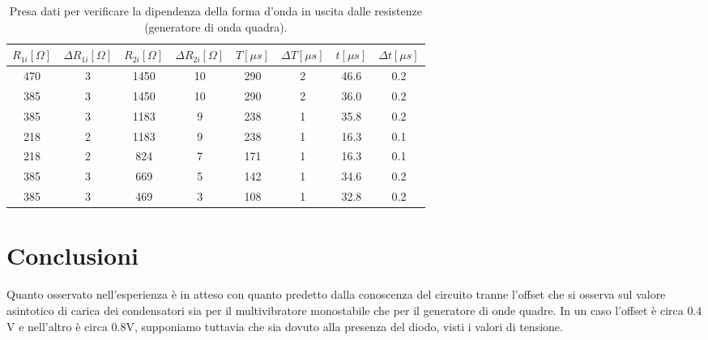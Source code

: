 \documentclass[10pt,a4paper]{article}
\begin{document}

\begin{table}[!htb]
\centering
\begin{tabular}{|c|c|c|c|c|c|c|c|}
\hline 
$R_{1i} [\Omega]$ & $\Delta R_{1i} [\Omega]$ & $R_{2i} [\Omega]$  & $\Delta R_{2i} [\Omega]$ & $T [\mu s]$ & $\Delta T [\mu s]$&$t [\mu s ]$ & $\Delta t [\mu s]$\\
\hline
 470 & 3 & 1450	& 10 & 290 & 2& 46.6& 0.2\\ 
\hline
385 & 3 & 1450	& 10 & 290 & 2& 36.0& 0.2\\ 
\hline 
 385 & 3 & 1183	& 9 & 238 & 1& 35.8& 0.2\\
\hline
218 & 2 & 1183	& 9 & 238 & 1& 16.3& 0.1\\ 
\hline
218 & 2 & 824	& 7 & 171 & 1& 16.3& 0.1\\ 
\hline
385 & 3 & 669	& 5 & 142 & 1& 34.6& 0.2\\ 
\hline
 385 & 3 & 469	& 3 & 108 & 1& 32.8& 0.2\\ 
 \hline
\end{tabular} 
\caption{Presa dati per verificare la dipendenza della forma d'onda in uscita dalle resistenze (generatore di onda quadra).\label{tab:generatore}}
\end{table}

\section{Conclusioni}

Quanto osservato nell'esperienza è in atteso con quanto predetto dalla conoscenza del circuito tranne l'offset che si osserva sul valore asintotico di carica dei condensatori sia per il multivibratore monostabile che per il generatore di onde quadre. In un caso l'offset è circa $0.4$V e nell'altro è circa $0.8$V, supponiamo tuttavia che sia dovuto alla presenza del diodo, visti i valori di tensione.\\
\end{document}
